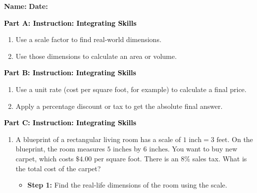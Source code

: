 \documentclass[12pt, letterpaper, fleqn]{article}
\newcommand{\blanklong}{\underline{\hspace{6.5cm}}}
\begin{document}
\textbf{Name:} \underline{\hspace{5cm}}
\hfill
\textbf{Date:} \underline{\hspace{3cm}}\\

\begin{tcolorbox}[colback=customteal!20]
\large\textcolor{black}{\textbf{Part A: Instruction: Integrating Skills}}
\end{tcolorbox}

\vspace{3mm}

\begin{enumerate}[itemsep=2.2cm, leftmargin=0.6cm]
\item Use a scale factor to find real-world dimensions.
\item Use those dimensions to calculate an area or volume.
\end{enumerate}

\newpage

\begin{tcolorbox}[colback=customteal!20]
\large\textcolor{black}{\textbf{Part B: Instruction: Integrating Skills}}
\end{tcolorbox}

\vspace{3mm}

\begin{enumerate}[itemsep=2.2cm, leftmargin=0.6cm, resume]
\item Use a unit rate (cost per square foot, for example) to calculate a final price.
\item Apply a percentage discount or tax to get the absolute final answer.
\end{enumerate}

\newpage

\begin{tcolorbox}[colback=customteal!20]
\large\textcolor{black}{\textbf{Part C: Instruction: Integrating Skills}}
\end{tcolorbox}

\vspace{3mm}

\begin{enumerate}[itemsep=2.2cm, leftmargin=0.6cm, resume]
\item A blueprint of a rectangular living room has a scale of $1\text{ inch} = 3\text{ feet}$. On the blueprint, the room measures $5\text{ inches}$ by $6\text{ inches}$. You want to buy new carpet, which costs $\$4.00$ per square foot. There is an $8\%$ sales tax. What is the total cost of the carpet?
\begin{itemize}
\item \textbf{Step 1:} Find the real-life dimensions of the room using the scale. \blanklong
\end{itemize}
\end{enumerate}
\end{document}
